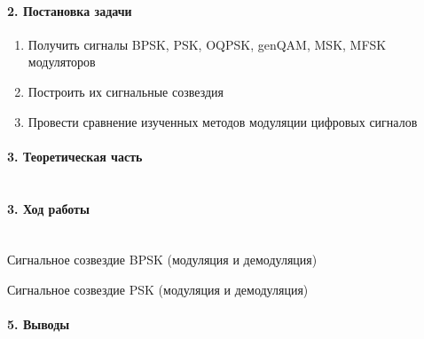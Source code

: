\documentclass[12pt,a4paper]{report}
\begin{document}
\paragraph{2. Постановка задачи\\}
\begin{enumerate}
\item Получить сигналы BPSK, PSK, OQPSK, genQAM, MSK, MFSK
модуляторов
\item Построить их сигнальные созвездия
\item Провести сравнение изученных методов модуляции цифровых
сигналов
\end{enumerate}

\paragraph{3. Теоретическая часть \\\\}

\paragraph{3. Ход работы \\\\}


Сигнальное созвездие BPSK (модуляция и демодуляция)

\begin{figure}[h!]
\end{figure}

Сигнальное созвездие PSK (модуляция и демодуляция)

\begin{figure}[h!]
\end{figure}



\paragraph{5. Выводы \\\\}
\end{document}
